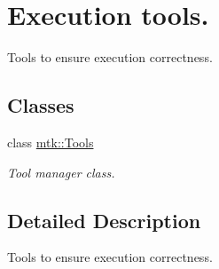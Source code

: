 \hypertarget{group__c03-execution__tools}{\section{Execution tools.}
\label{group__c03-execution__tools}
}


Tools to ensure execution correctness.  


\subsection*{Classes}
\begin{DoxyCompactItemize}
\item 
class \hyperlink{classmtk_1_1Tools}{mtk\+::\+Tools}
\begin{DoxyCompactList}\small\item\em Tool manager class. \end{DoxyCompactList}\end{DoxyCompactItemize}


\subsection{Detailed Description}
Tools to ensure execution correctness. 